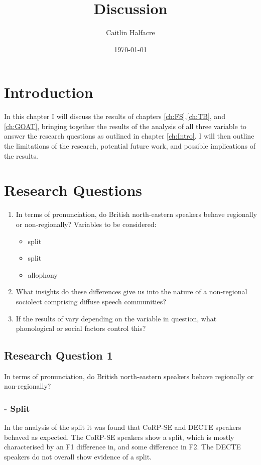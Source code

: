 \documentclass[../../00.FullDoc/tex/ThesisSkeleton-draft2]{subfiles}
\title{Discussion}
\author{Caitlin Halfacre}
\date{\today}
\begin{document}
	\onlyinsubfile{
	\maketitle
	\pagebreak
	\tableofcontents
	\onehalfspacing
	\pagestyle{scrheadings}
				}
	
\section{Introduction} \label{sec:disc:Intro}
In this chapter I will discuss the results of chapters \ref{ch:FS},\ref{ch:TB}, and \ref{ch:GOAT}, bringing together the results of the analysis of all three variable to answer the research questions as outlined in chapter \ref{ch:Intro}.
I will then outline the limitations of the research, potential future work, and possible implications of the results.


\section{Research Questions} \label{sec:disc:RQs}
\begin{enumerate}
	\item In terms of pronunciation, do British north-eastern  speakers behave regionally or non-regionally?
	Variables to be considered:
	\begin{itemize}
		\item \FS{} split
		\item \TB{} split
		\item \goat{} allophony
	\end{itemize}
	\item What insights do these differences give us into the nature of a non-regional sociolect comprising diffuse speech communities?
	\item If the results of \notinsubfile{\ref{RQ1}}  vary depending on the variable in question, what phonological or social factors control this?
\end{enumerate}

\subsection{Research Question 1} \label{sec:disc:RQ1}
In terms of pronunciation, do British north-eastern  speakers behave regionally or non-regionally?

\subsubsection{- Split}
In the analysis of the \FS{} split it was found that CoRP-SE and DECTE speakers behaved as expected. The CoRP-SE speakers show a split, which is mostly characterised by an F1 difference in, and some difference in F2. The DECTE speakers do not overall show evidence of a split.
\end{document}
